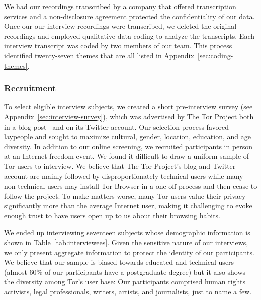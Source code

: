 We had our recordings transcribed by a company that offered transcription
services and a non-disclosure agreement protected the confidentiality of our
data.  Once our our interview recordings were transcribed, we deleted the
original recordings and employed qualitative data coding to analyze the
transcripts.  Each interview transcript was coded by two members of our team.
This process identified twenty-seven themes that are all listed in
Appendix~\ref{sec:coding-themes}.

\subsubsection{Recruitment}

To select eligible interview subjects, we created a short pre-interview survey
(see Appendix~\ref{sec:interview-survey}), which was advertised by The Tor
Project both in a blog post~\cite{Winter2017a} and on its Twitter account.  Our
selection process favored laypeople and sought to maximize cultural, gender,
location, education, and age diversity.  In addition to our online screening, we
recruited participants in person at an Internet freedom event.  We found it
difficult to draw a uniform sample of Tor users to interview. We believe that
The Tor Project's blog and Twitter account are mainly followed by
disproportionately technical users while many non-technical users may install
Tor Browser in a one-off process and then cease to follow the project.  To make
matters worse, many Tor users value their privacy significantly more than the
average Internet user, making it challenging to evoke enough trust to have users
open up to us about their browsing habits.

We ended up interviewing seventeen subjects whose demographic information is
shown in Table~\ref{tab:interviewees}.  Given the sensitive nature of our
interviews, we only present aggregate information to protect the identity of our
participants.  We believe that our sample is biased towards educated and
technical users (almost 60\% of our participants have a postgraduate degree) but
it also shows the diversity among Tor's user base: Our participants comprised
human rights activists, legal professionals, writers, artists, and journalists,
just to name a few.

